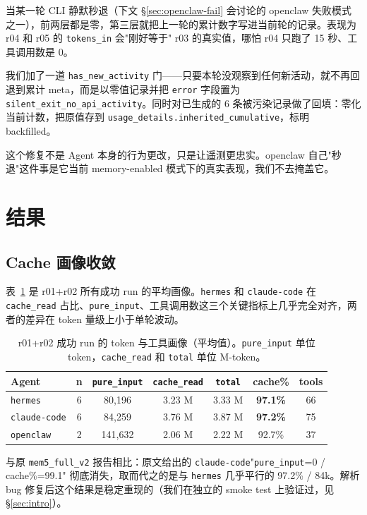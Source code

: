 \documentclass[11pt,a4paper]{article}
\begin{document}
当某一轮 CLI 静默秒退（下文 \S\ref{sec:openclaw-fail} 会讨论的 openclaw 失败模式之一），前两层都是零，第三层就把上一轮的累计数字写进当前轮的记录。表现为 r04 和 r05 的 \texttt{tokens\_in} 会"刚好等于" r03 的真实值，哪怕 r04 只跑了 15 秒、工具调用数是 0。

我们加了一道 \texttt{has\_new\_activity} 门——只要本轮没观察到任何新活动，就不再回退到累计 meta，而是以零值记录并把 \texttt{error} 字段置为 \texttt{silent\_exit\_no\_api\_activity}。同时对已生成的 6 条被污染记录做了回填：零化当前计数，把原值存到 \texttt{usage\_details.inherited\_cumulative}，标明 backfilled。

这个修复不是 Agent 本身的行为更改，只是让遥测更忠实。openclaw 自己"秒退"这件事是它当前 memory-enabled 模式下的真实表现，我们不去掩盖它。

\section{结果}

\subsection{Cache 画像收敛}
表~\ref{tab:cache-profile} 是 r01+r02 所有成功 run 的平均画像。\texttt{hermes} 和 \texttt{claude-code} 在 \texttt{cache\_read} 占比、\texttt{pure\_input}、工具调用数这三个关键指标上几乎完全对齐，两者的差异在 token 量级上小于单轮波动。

\begin{table}[h]
\centering
\caption{r01+r02 成功 run 的 token 与工具画像（平均值）。\texttt{pure\_input} 单位 token，\texttt{cache\_read} 和 \texttt{total} 单位 M-token。}
\label{tab:cache-profile}
\begin{tabular}{lcccccc}
\toprule
Agent & n & \texttt{pure\_input} & \texttt{cache\_read} & \texttt{total} & cache\% & tools \\
\midrule
\texttt{hermes}      & 6 & 80{,}196 & 3.23 M & 3.33 M & \textbf{97.1\%} & 66 \\
\texttt{claude-code} & 6 & 84{,}259 & 3.76 M & 3.87 M & \textbf{97.2\%} & 75 \\
\texttt{openclaw}    & 2 & 141{,}632 & 2.06 M & 2.22 M & 92.7\% & 37 \\
\bottomrule
\end{tabular}
\end{table}

与原 \texttt{mem5\_full\_v2} 报告相比：原文给出的 \texttt{claude-code}"\texttt{pure\_input}=0 / cache\%=99.1" 彻底消失，取而代之的是与 \texttt{hermes} 几乎平行的 97.2\% / 84k。解析 bug 修复后这个结果是稳定重现的（我们在独立的 smoke test 上验证过，见 \S\ref{sec:intro}）。
\end{document}
